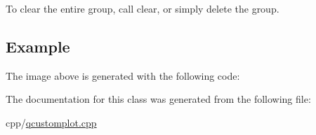 To clear the entire group, call clear, or simply delete the group.\hypertarget{class_q_c_p_bars_group_qcpbarsgroup-example}{}\subsection{Example}\label{class_q_c_p_bars_group_qcpbarsgroup-example}
The image above is generated with the following code\+: 
\begin{DoxyCodeInclude}
\end{DoxyCodeInclude}


The documentation for this class was generated from the following file\+:\begin{DoxyCompactItemize}
\item 
cpp/\mbox{\hyperlink{qcustomplot_8cpp}{qcustomplot.\+cpp}}\end{DoxyCompactItemize}
